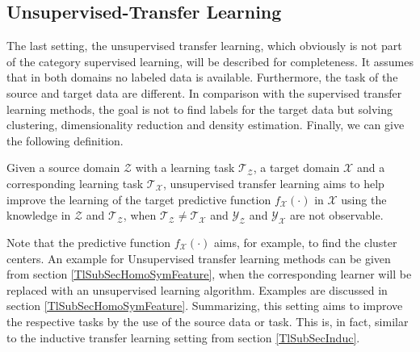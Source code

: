 \subsection{Unsupervised-Transfer Learning}\label{TlSubSecUnsuper}
The last setting, the unsupervised transfer learning, which obviously is not part of the category supervised learning, will be described for completeness.
It assumes that in both domains no labeled data is available.
Furthermore, the task of the source and target data are different.
In comparison with the supervised transfer learning methods, the goal is not to find labels for the target data but solving clustering, dimensionality reduction and density estimation.\cite{Pan.2010}
Finally, we can give the following definition.
\begin{mDef}\label{DefUTL}
	 Given a source domain $\mathcal{Z}$ with a learning task $\mathcal{T_Z}$, a target domain $\mathcal{X}$ and a corresponding learning task $\mathcal{T_X}$, unsupervised transfer learning aims to help improve the learning of the target predictive function $f_\mathcal{X}(\cdot)$ in $\mathcal{X}$ using the knowledge in $\mathcal{Z}$ and $\mathcal{T_Z}$, when $\mathcal{T_Z} \neq \mathcal{T_X}$ and $\mathcal{Y_Z}$ and $\mathcal{Y_X}$ are not observable.
\end{mDef}
Note that the predictive function $f_\mathcal{X}(\cdot)$ aims, for example, to find the cluster centers.
An example for Unsupervised transfer learning methods can be given from section \ref{TlSubSecHomoSymFeature}, when the corresponding learner will be replaced with an unsupervised learning algorithm.
Examples are discussed in section \ref{TlSubSecHomoSymFeature}.
Summarizing, this setting aims to improve the respective tasks by the use of the source data or task.
This is, in fact, similar to the inductive transfer learning setting from section \ref{TlSubSecInduc}.\cite{Pan.2010}

